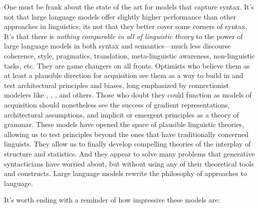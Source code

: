 \documentclass[output=paper,colorlinks,citecolor=brown
]{langscibook}
\begin{document}
One must be frank about the state of the art for models that capture syntax. It's not that large language models offer slightly higher performance than other approaches in linguistics; its not that they better cover some corners of syntax. It's that there is \emph{nothing comparable in all of linguistic theory} to the power of large language models in both syntax and semantics---much less discourse coherence, style, pragmatics, translation, meta-linguistic awareness, non-linguistic tasks, etc. They are game changers on all fronts. Optimists who believe them as at least a plausible direction for acquisition see them as a way to build in and test architectural principles and biases, long emphasized by connectionist modelers like \cite{mcclelland1986parallel}, \cite{elman1996rethinking}, \cite{smolensky2006harmonic}, and others. Those who doubt they could function as models of acquisition should nonetheless see the success of gradient representations, architectural assumptions, and implicit or emergent principles as a theory of grammar. These models have opened the space of plausible linguistic theories, allowing us to test principles beyond the ones that have traditionally concerned linguists. They allow us to finally develop compelling theories of the interplay of structure and statistics. And they appear to solve many problems that generative syntacticians have worried about, but without using any of their theoretical tools and constructs. Large language models rewrite the philosophy of approaches to language. 

It's worth ending with a reminder of how impressive these models are:



\end{document}
